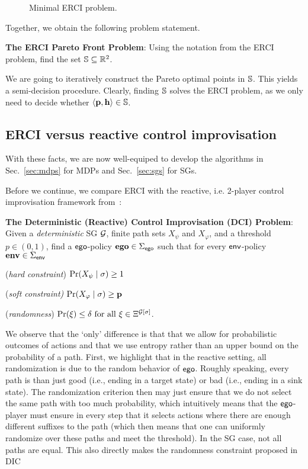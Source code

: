 {{{{\begin{figure}
\caption{Minimal ERCI problem.}
\end{figure}


Together, we obtain the following problem statement.
\begin{mdframed}[backgroundcolor=white!5]
\textbf{The ERCI Pareto Front Problem}:
Using the notation from the ERCI problem, find the set $\mathbb{S} \subseteq \mathbb{R}^2$.
\end{mdframed}
We are going to iteratively construct the  Pareto optimal points in $\mathbb{S}$. This yields a semi-decision procedure.
Clearly, finding $\mathbb{S}$ solves the ERCI problem, as we only need to decide whether $\langle \mathbf{p}, \mathbf{h} \rangle \in \mathbb{S}$.

\subsection{ERCI versus reactive control improvisation}

With these facts, we are now well-equiped to develop the algorithms in Sec.~\ref{sec:mdps} for MDPs and Sec.~\ref{sec:sgs} for SGs.

Before we continue, we compare ERCI with the reactive, i.e. 2-player control improvisation framework from~\cite{}:
\begin{mdframed}
\textbf{The Deterministic (Reactive) Control Improvisation (DCI) Problem}:
Given a \emph{deterministic} SG $\mathcal{G}$, finite path sets $X_\psi$ and $X_\varphi$, and a threshold $p \in (0,1)$,  find a $\mathsf{ego}$-policy $\mathbf{ego} \in \Sigma_{\mathsf{ego}}$  such that for every $\mathsf{env}$-policy $\mathbf{env} \in \Sigma_{\mathsf{env}}$ 
\begin{compactenum}
\item (\emph{hard constraint}) $\Pr(X_\psi \mid \sigma) \geq 1$
	\item (\emph{soft constraint)} $\Pr(X_\varphi \mid \sigma) \geq \mathbf{p}$
	\item (\emph{randomness}) $\Pr(\xi) \leq \delta \text{ for all } \xi \in \Xi^{\mathcal{G}[\sigma]}_{}$.
\end{compactenum}
\end{mdframed}
We observe that the `only' difference is that that we allow for probabilistic outcomes of actions and that we use entropy rather than an upper bound on the probability of a path. 
First, we highlight that in the reactive setting, all randomization is due to the random behavior of $\mathsf{ego}$. Roughly speaking, every path is than just good (i.e., ending in a target state) or bad (i.e., ending in a sink state). The randomization criterion then may just ensure that we do not select the same path with too much probability, which intuitively means that the $\mathsf{ego}$-player must ensure in every step that it selects actions where there are enough different suffixes to the path (which then means that one can uniformly randomize over these paths and meet the threshold).
In the SG case, not all paths are equal. This also directly makes the randomness constraint proposed in DIC

}}}}
